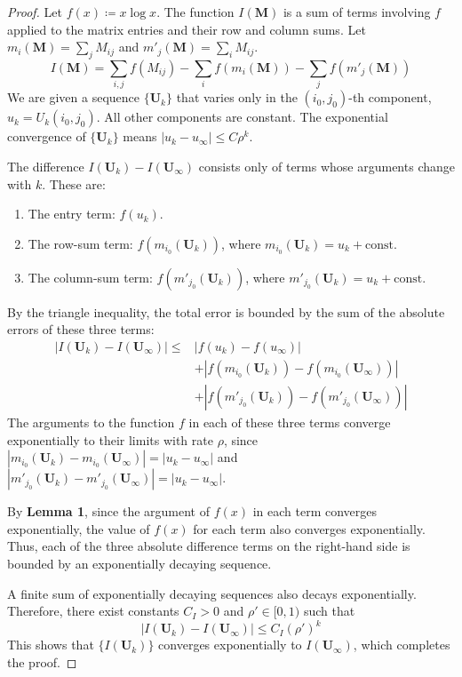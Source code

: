 \documentclass[../../main.tex]{subfiles}
\begin{document}
\begin{proof}
Let $f(x) \coloneqq x \log x$. The function $I(\bm{M})$ is a sum of terms involving $f$ applied to the matrix entries and their row and column sums. Let $m_i(\bm{M}) = \sum_j M_{ij}$ and $m'_j(\bm{M}) = \sum_i M_{ij}$.
\[
    I(\bm{M}) = \sum_{i,j} f(M_{ij}) - \sum_i f(m_i(\bm{M})) - \sum_j f(m'_j(\bm{M}))
\]
We are given a sequence $\{\bm{U}_k\}$ that varies only in the $(i_0, j_0)$-th component, $u_k = U_k(i_0, j_0)$. All other components are constant. The exponential convergence of $\{\bm{U}_k\}$ means $|u_k - u_\infty| \le C \rho^k$.

The difference $I(\bm{U}_k) - I(\bm{U}_\infty)$ consists only of terms whose arguments change with $k$. These are:
\begin{enumerate}
    \item The entry term: $f(u_k)$.
    \item The row-sum term: $f(m_{i_0}(\bm{U}_k))$, where $m_{i_0}(\bm{U}_k) = u_k + \text{const}$.
    \item The column-sum term: $f(m'_{j_0}(\bm{U}_k))$, where $m'_{j_0}(\bm{U}_k) = u_k + \text{const}$.
\end{enumerate}
By the triangle inequality, the total error is bounded by the sum of the absolute errors of these three terms:
\begin{align*}
|I(\bm{U}_k) - I(\bm{U}_\infty)| \le & |f(u_k) - f(u_\infty)| \\
& + |f(m_{i_0}(\bm{U}_k)) - f(m_{i_0}(\bm{U}_\infty))| \\
& + |f(m'_{j_0}(\bm{U}_k)) - f(m'_{j_0}(\bm{U}_\infty))|
\end{align*}
The arguments to the function $f$ in each of these three terms converge exponentially to their limits with rate $\rho$, since $|m_{i_0}(\bm{U}_k) - m_{i_0}(\bm{U}_\infty)| = |u_k - u_\infty|$ and $|m'_{j_0}(\bm{U}_k) - m'_{j_0}(\bm{U}_\infty)| = |u_k - u_\infty|$.

By \textbf{Lemma 1}, since the argument of $f(x)$ in each term converges exponentially, the value of $f(x)$ for each term also converges exponentially. Thus, each of the three absolute difference terms on the right-hand side is bounded by an exponentially decaying sequence.

A finite sum of exponentially decaying sequences also decays exponentially. Therefore, there exist constants $C_I > 0$ and $\rho' \in [0, 1)$ such that
\[
|I(\bm{U}_k) - I(\bm{U}_\infty)| \le C_I (\rho')^k
\]
This shows that $\{I(\bm{U}_k)\}$ converges exponentially to $I(\bm{U}_\infty)$, which completes the proof.
\end{proof}
\end{document}
